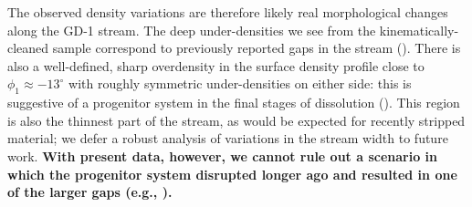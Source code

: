 \documentclass[modern]{aastex62}
\newcommand{\gaia}{\textsl{Gaia}}
\newcommand{\masyr}{\ensuremath{\textrm{mas}~\textrm{yr}^{-1}}}
\newcommand{\changes}[1]{{\textbf{#1}}}
\begin{document}
The observed density variations are therefore likely real morphological changes
along the GD-1 stream.
The deep under-densities we see from the kinematically-cleaned sample correspond
to previously reported gaps in the stream (\citealt{Carlberg:2013, DeBoer:2018}).
There is also a well-defined, sharp overdensity in the surface density profile
close to $\phi_1 \approx -13^\circ$ with roughly symmetric under-densities on
either side:
this is suggestive of a progenitor system in the final stages of dissolution
(\citealt{Balbinot:2018}).
This region is also the thinnest part of the stream, as would be expected for
recently stripped material; we defer a robust analysis of variations in the
stream width to future work.
\changes{With present data, however, we cannot rule out a scenario in which the progenitor system disrupted longer ago and resulted in one of the larger gaps (e.g., \citealt{DeBoer:2018}).}
\end{document}
